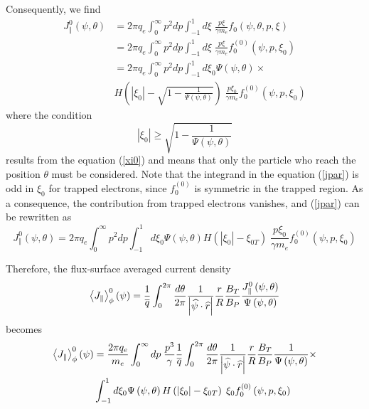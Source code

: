 Consequently, we find
\begin{align}
J_{\Vert}^{0}\left( \psi,\theta\right) & =2\pi
q_{e}\int_{0}^{\infty}p^{2}dp\int_{-1}^{1}d\xi\;\frac{p\xi}{\gamma m_{e}}
f_{0}\left( \psi ,\theta,p,\xi\right)  \nonumber \\
& =2\pi q_{e}\int_{0}^{\infty}p^{2}dp\int_{-1}^{1}d\xi\;\frac{p\xi}{\gamma
m_{e}}f_{0}^{(0)}\left( \psi,p,\xi_{0}\right)  \nonumber \\
& =2\pi q_{e}\int_{0}^{\infty}p^{2}dp\int_{-1}^{1}d\xi_{0}\Psi\left(
\psi,\theta\right) \times  \nonumber \\
& H\left( \left| \xi_{0}\right| -\sqrt{1-\frac{1}{\Psi\left( \psi
,\theta\right) }}\right) \;\frac{p\xi_{0}}{\gamma m_{e}}f_{0}^{(0)}\left(
\psi,p,\xi_{0}\right)  \label{jpar}
\end{align}
where the condition
\begin{equation}
\left| \xi_{0}\right| \geq\sqrt{1-\frac{1}{\Psi\left( \psi,\theta\right) }}
\label{xi0cond}
\end{equation}
results from the equation (\ref{xi0}) and means that only the particle who
reach the position $\theta$ must be considered. Note that the integrand in
the equation (\ref{jpar}) is odd in $\xi_{0}$ for trapped electrons, since $%
f_{0}^{(0)}$ is symmetric in the trapped region. As a consequence, the
contribution from trapped electrons vanishes, and (\ref{jpar}) can be
rewritten as
\begin{equation}
J_{\Vert}^{0}\left( \psi,\theta\right) =2\pi
q_{e}\int_{0}^{\infty}p^{2}dp\int_{-1}^{1}d\xi_{0}\Psi\left(
\psi,\theta\right) H\left( \left| \xi_{0}\right| -\xi_{0T}\right) \;\frac{
p\xi_{0}}{\gamma m_{e}}f_{0}^{(0)}\left( \psi,p,\xi_{0}\right)
\end{equation}

Therefore, the flux-surface averaged current density
\begin{equation}
\left\langle J_{\Vert}\right\rangle _{\phi}^{0}\left( \psi\right) =\frac {1}{%
\overline{q}}\int_{0}^{2\pi}\frac{d\theta}{2\pi}\frac{1}{\left| \widehat{\psi%
}\cdot\widehat{r}\right| }\frac{r}{R}\frac{B_{T}}{B_{P}}\frac{
J_{\Vert}^{0}\left( \psi,\theta\right) }{\Psi\left( \psi ,\theta\right) }
\end{equation}
becomes
\begin{align}
\left\langle J_{\Vert}\right\rangle _{\phi}^{0}\left( \psi\right) & =\frac{
2\pi q_{e}}{m_{e}}\int_{0}^{\infty}dp\;\frac{p^{3}}{\gamma}\frac {1}{%
\overline{q}}\int_{0}^{2\pi}\frac{d\theta}{2\pi}\frac{1}{\left| \widehat{\psi%
}\cdot\widehat{r}\right| }\frac{r}{R}\frac{B_{T}}{B_{P}}\frac {1}{\Psi\left(
\psi,\theta\right) }\times  \nonumber \\
& \int_{-1}^{1}d\xi_{0}\Psi\left( \psi,\theta\right) H\left( \left|
\xi_{0}\right| -\xi_{0T}\right) \;\xi_{0}f_{0}^{(0)}\left( \psi,p,\xi
_{0}\right)
\end{align}

